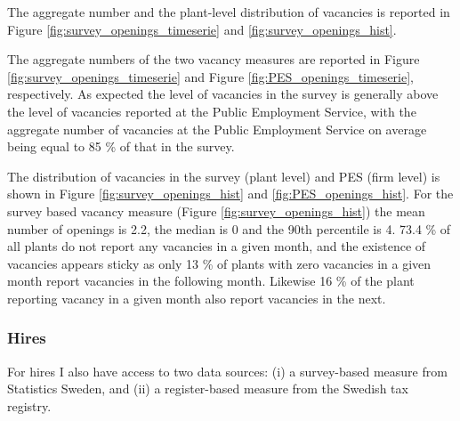 The aggregate number and the plant-level distribution of vacancies is reported in Figure \ref{fig:survey_openings_timeserie} and \ref{fig:survey_openings_hist}. 

The aggregate numbers of the two vacancy measures are reported in Figure \ref{fig:survey_openings_timeserie} and Figure \ref{fig:PES_openings_timeserie}, respectively. As expected the level of vacancies in the survey is generally above the level of vacancies reported at the Public Employment Service, with the aggregate number of vacancies at the Public Employment Service on average being equal to 85 \% of that in the survey. %

The distribution of vacancies in the survey (plant level) and PES (firm level) is shown in Figure \ref{fig:survey_openings_hist} and \ref{fig:PES_openings_hist}. For the survey based vacancy measure (Figure \ref{fig:survey_openings_hist}) the mean number of openings is 2.2, the median is 0 and the 90th percentile is 4. 73.4 \% of all plants do not report any vacancies in a given month, and the existence of vacancies appears sticky as only 13 \% of plants with zero vacancies in a given month report vacancies in the following month. Likewise 16 \% of the plant reporting vacancy in a given month also report vacancies in the next. 

\subsubsection{Hires}

For hires I also have access to two data sources: (i) a survey-based measure from Statistics Sweden, and (ii) a register-based measure from the Swedish tax registry. 

